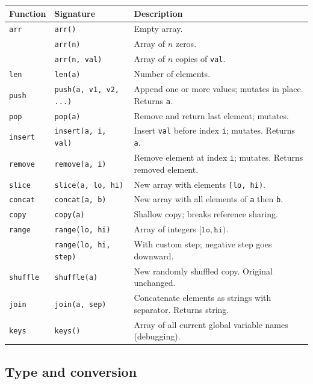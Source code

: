 \documentclass[11pt,a4paper]{article}
\begin{document}
\begin{longtable}{@{}L{3.2cm}L{4.5cm}L{7cm}@{}}
\toprule
\textbf{Function} & \textbf{Signature} & \textbf{Description} \\
\midrule
\endhead
\texttt{arr}      & \texttt{arr()}                 & Empty array. \\
                  & \texttt{arr(n)}                & Array of $n$ zeros. \\
                  & \texttt{arr(n, val)}           & Array of $n$ copies of \texttt{val}. \\
\texttt{len}      & \texttt{len(a)}               & Number of elements. \\
\texttt{push}     & \texttt{push(a, v1, v2, ...)} & Append one or more values; mutates in place. Returns \texttt{a}. \\
\texttt{pop}      & \texttt{pop(a)}               & Remove and return last element; mutates. \\
\texttt{insert}   & \texttt{insert(a, i, val)}    & Insert \texttt{val} before index \texttt{i}; mutates. Returns \texttt{a}. \\
\texttt{remove}   & \texttt{remove(a, i)}         & Remove element at index \texttt{i}; mutates. Returns removed element. \\
\texttt{slice}    & \texttt{slice(a, lo, hi)}     & New array with elements \texttt{[lo, hi)}. \\
\texttt{concat}   & \texttt{concat(a, b)}         & New array with all elements of \texttt{a} then \texttt{b}. \\
\texttt{copy}     & \texttt{copy(a)}              & Shallow copy; breaks reference sharing. \\
\texttt{range}    & \texttt{range(lo, hi)}        & Array of integers $[\texttt{lo}, \texttt{hi})$. \\
                  & \texttt{range(lo, hi, step)}  & With custom step; negative step goes downward. \\
\texttt{shuffle}  & \texttt{shuffle(a)}           & New randomly shuffled copy. Original unchanged. \\
\texttt{join}     & \texttt{join(a, sep)}         & Concatenate elements as strings with separator. Returns string. \\
\texttt{keys}     & \texttt{keys()}               & Array of all current global variable names (debugging). \\
\bottomrule
\end{longtable}

\subsection{Type and conversion}
\end{document}
